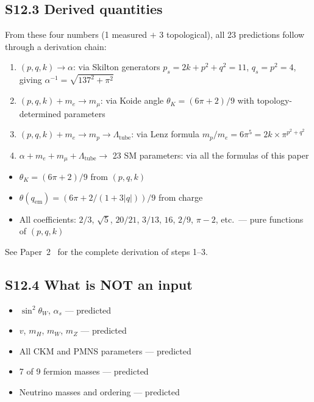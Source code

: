 \documentclass[11pt,a4paper]{article}
\begin{document}
\subsection{S12.3 Derived quantities}

From these four numbers (1 measured $+$ 3 topological), all 23 predictions follow through a derivation chain:
\begin{enumerate}
  \item $(p,q,k) \to \alpha$: via Skilton generators $p_s = 2k + p^2 + q^2 = 11$, $q_s = p^2 = 4$, giving $\alpha^{-1} = \sqrt{137^2 + \pi^2}$
  \item $(p,q,k) + m_e \to m_\mu$: via Koide angle $\theta_K = (6\pi+2)/9$ with topology-determined parameters
  \item $(p,q,k) + m_e \to m_p \to \Lambda_{\text{tube}}$: via Lenz formula $m_p/m_e = 6\pi^5 = 2k \times \pi^{p^2+q^2}$
  \item $\alpha + m_e + m_\mu + \Lambda_{\text{tube}} \to$ 23 SM parameters: via all the formulas of this paper
\end{enumerate}
\begin{itemize}
  \item $\theta_K = (6\pi+2)/9$ from $(p,q,k)$
  \item $\theta(q_{\text{em}}) = (6\pi + 2/(1+3|q|))/9$ from charge
  \item All coefficients: $2/3$, $\sqrt{5}$, $20/21$, $3/13$, $16$, $2/9$, $\pi-2$, etc.\ --- pure functions of $(p,q,k)$
\end{itemize}

See Paper~2~\cite{galasyn2026b} for the complete derivation of steps 1--3.

\subsection{S12.4 What is NOT an input}

\begin{itemize}
  \item $\sin^2\theta_W$, $\alpha_s$ --- predicted
  \item $v$, $m_H$, $m_W$, $m_Z$ --- predicted
  \item All CKM and PMNS parameters --- predicted
  \item 7 of 9 fermion masses --- predicted
  \item Neutrino masses and ordering --- predicted
\end{itemize}

\end{document}
